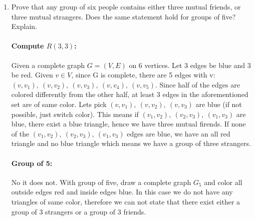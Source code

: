 \documentclass{article}
\begin{document}
\begin{enumerate} [label=(\arabic*)]
	\item Prove that any group of six people contains either three mutual
		friends, or three mutual strangers. Does the same statement hold for groups
		of five? Explain.\\
		\paragraph{Compute $R(3,3)$: }Given a complete graph $G=(V, E)$ on 6
		vertices. Let 3 edges be blue and 3 be red. Given $v \in V$, since G is
		complete, there are 5 edges with v: $(v, v_1),\ (v, v_2),\ (v, v_3),\ (v,
		v_4),\ (v, v_5)$. Since half of the edges are colored differently from
		the other half, at least 3 edges in the aforementioned set are of same
		color. Lets pick $(v, v_1),\ (v, v_2),\ (v, v_3)$ are blue (if not possible,
		just switch color). This means if $(v_1, v_2),\ (v_2, v_3),\ (v_1, v_3)$ are
		blue, there exist a blue triangle, hence we have three mutual firends. If
		none of the $(v_1, v_2),\ (v_2, v_3),\ (v_1, v_3)$ edges are blue, we have
		an all red triangle and no blue triangle which means we have a group of
		three strangers.
		\paragraph{Group of 5: }No it does not. With group of five, draw a complete
		graph $G_5$ and color all outside edges red and inside edges blue. In this
		case we do not have any triangles of same color, therefore we can not state
		that there exist either a group of 3 strangers or a group of 3 friends.

\end{enumerate}
\end{document}
